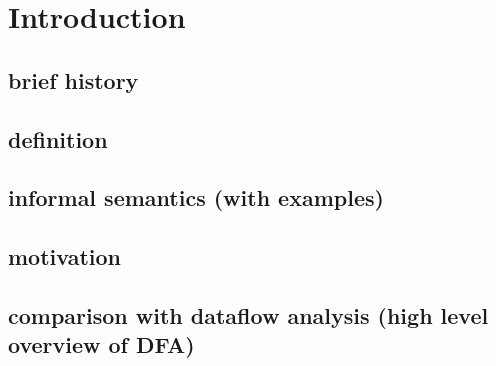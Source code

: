 \chapter*{Introduction}



\section{brief history}
\section{definition}
\section{informal semantics (with examples)}
\section{motivation}
\section{comparison with dataflow analysis (high level overview of DFA)}

